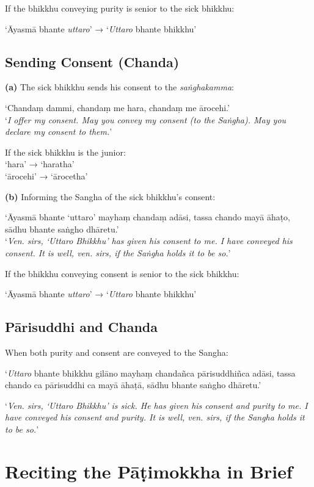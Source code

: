 If the bhikkhu conveying purity is senior to the sick bhikkhu:

‘Āyasmā bhante \emph{uttaro}’ → ‘\emph{Uttaro} bhante bhikkhu’

\subsection{Sending Consent (Chanda)}

\textbf{(a)} The sick bhikkhu sends his consent to the \emph{saṅghakamma}:

‘Chandaṃ dammi, chandaṃ me hara, chandaṃ me ārocehi.’\\
‘\emph{I offer my consent. May you convey my consent (to the Saṅgha). May you
  declare my consent to them.}’

If the sick bhikkhu is the junior:\\
‘hara’ → ‘haratha’\\
‘ārocehi’ → ‘ārocetha’

\ifhandbookedition
\clearpage
\fi

\textbf{(b)} Informing the Sangha of the sick bhikkhu's consent:

‘Āyasmā bhante ‘uttaro’ mayhaṃ chandaṃ adāsi, tassa chando mayā āhaṭo, sādhu bhante saṅgho dhāretu.’\\
‘\emph{Ven. sirs, ‘Uttaro Bhikkhu’ has given his consent to me. I have conveyed
  his consent. It is well, ven. sirs, if the Saṅgha holds it to be so.}’

If the bhikkhu conveying consent is senior to the sick bhikkhu:

‘Āyasmā bhante \emph{uttaro}’ → ‘\emph{Uttaro} bhante bhikkhu’

\subsection{Pārisuddhi and Chanda}

When both purity and consent are conveyed to the Sangha:

‘\emph{Uttaro} bhante bhikkhu gilāno mayhaṃ chandañca pārisuddhiñca adāsi, tassa
chando ca pārisuddhi ca mayā āhaṭā, sādhu bhante saṅgho dhāretu.’

‘\emph{Ven. sirs, ‘Uttaro Bhikkhu’ is sick. He has given his consent and purity
  to me. I have conveyed his consent and purity. It is well, ven. sirs, if the
  Sangha holds it to be so.}’

\ifhandbookedition
\clearpage
\fi

\section{Reciting the Pāṭimokkha in Brief}

